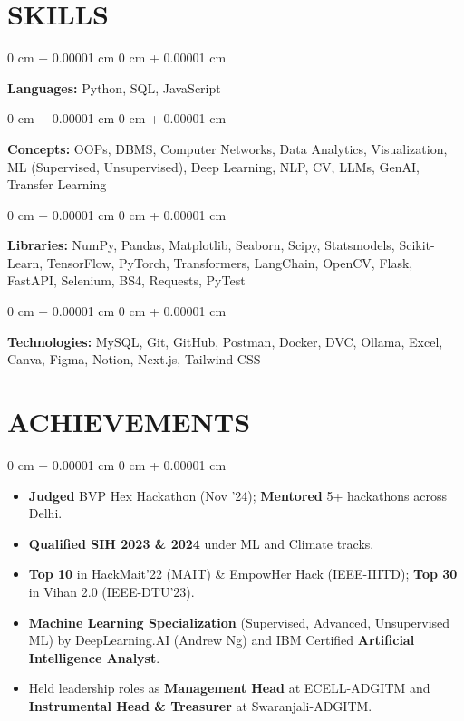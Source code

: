 \documentclass[10pt, letterpaper]{article}
\newenvironment{highlights}{
    \begin{itemize}[
        topsep=0.10 cm,
        parsep=0.10 cm,
        partopsep=0pt,
        itemsep=0pt,
        leftmargin=0 cm + 10pt
    ]
}{
    \end{itemize}
} %
\newenvironment{onecolentry}{
    \begin{adjustwidth}{
        0 cm + 0.00001 cm
    }{
        0 cm + 0.00001 cm
    }
}{
    \end{adjustwidth}
} %
\let\hrefWithoutArrow\href
\begin{document}
    
    \section{SKILLS}

        \begin{onecolentry}
            \textbf{Languages:} Python, SQL, JavaScript
        \end{onecolentry}

        \vspace{0.1 cm}

        \begin{onecolentry}
            \textbf{Concepts:} OOPs, DBMS, Computer Networks, Data Analytics, Visualization, ML (Supervised, Unsupervised), Deep Learning, NLP, CV, LLMs, GenAI, Transfer Learning
        \end{onecolentry}

        \vspace{0.1 cm}

        \begin{onecolentry}
            \textbf{Libraries:} NumPy, Pandas, Matplotlib, Seaborn, Scipy, Statsmodels, Scikit-Learn, TensorFlow, PyTorch, Transformers, LangChain, OpenCV, Flask, FastAPI, Selenium, BS4, Requests, PyTest
        \end{onecolentry}

        \vspace{0.1 cm}

        \begin{onecolentry}
            \textbf{Technologies:} MySQL, Git, GitHub, Postman, Docker, DVC, Ollama, Excel, Canva, Figma, Notion, Next.js, Tailwind CSS
        \end{onecolentry}



    \section{ACHIEVEMENTS}

        \begin{onecolentry}
            \begin{highlights}
                \item \textbf{Judged} BVP Hex Hackathon (Nov '24); \textbf{Mentored} 5+ hackathons across Delhi.
                \item \textbf{Qualified SIH 2023 \& 2024} under ML and Climate tracks.
                \item \textbf{Top 10} in HackMait’22 (MAIT) \& EmpowHer Hack (IEEE-IIITD); \textbf{Top 30} in Vihan 2.0 (IEEE-DTU’23).
                \item \textbf{Machine Learning Specialization} (Supervised, Advanced, Unsupervised ML) by DeepLearning.AI (Andrew Ng) and IBM Certified \textbf{Artificial Intelligence Analyst}.
                \item Held leadership roles as \textbf{Management Head} at ECELL-ADGITM and \textbf{Instrumental Head \& Treasurer} at Swaranjali-ADGITM.
            \end{highlights}
        \end{onecolentry}



\end{document}

